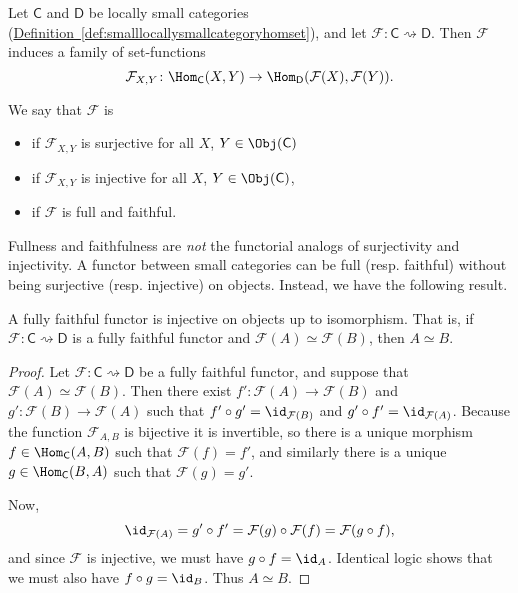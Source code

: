 \documentclass[notes.tex]{subfiles}
\begin{document}
\begin{definition}
  \label{def:fullfaithfulfunctor}
  Let $\mathsf{C}$ and $\mathsf{D}$ be locally small categories (\hyperref[def:smalllocallysmallcategoryhomset]{Definition~\ref*{def:smalllocallysmallcategoryhomset}}), and let $\mathcal{F}: \mathsf{C} \rightsquigarrow \mathsf{D}$. Then $\mathcal{F}$ induces a family of set-functions
  \begin{equation*}
    \mathcal{F}_{X, Y}\colon \Hom_{\mathsf{C}}(X, Y) \to \Hom_{\mathsf{D}}(\mathcal{F}(X), \mathcal{F}(Y)).
  \end{equation*}

  We say that $\mathcal{F}$ is
  \begin{itemize}
    \item {} if $\mathcal{F}_{X, Y}$ is surjective for all $X$, $Y \in \Obj(\mathsf{C})$
    \item {} if $\mathcal{F}_{X, Y}$ is injective for all $X$, $Y \in \Obj(\mathsf{C})$,
    \item {} if $\mathcal{F}$ is full and faithful.
  \end{itemize}
\end{definition}

\begin{note}
  Fullness and faithfulness are \emph{not} the functorial analogs of surjectivity and injectivity. A functor between small categories can be full (resp. faithful) without being surjective (resp. injective) on objects. Instead, we have the following result.
\end{note}

\begin{lemma}
  \label{lemma:fullyfaithfulfunctorinjectiveuptoisomorphism}
  A fully faithful functor is injective on objects up to isomorphism. That is, if  $\mathcal{F}\colon \mathsf{C} \rightsquigarrow \mathsf{D}$ is a fully faithful functor and $\mathcal{F}(A) \simeq \mathcal{F}(B)$, then $A \simeq B$.
\end{lemma}
\begin{proof}
  Let $\mathcal{F}\colon \mathsf{C} \rightsquigarrow \mathsf{D}$ be a fully faithful functor, and suppose that $\mathcal{F}(A) \simeq \mathcal{F}(B)$. Then there exist $f'\colon \mathcal{F}(A) \to \mathcal{F}(B)$ and $g'\colon \mathcal{F}(B) \to \mathcal{F}(A)$ such that $f' \circ g' = \id_{\mathcal{F}(B)}$ and $g' \circ f' = \id_{\mathcal{F}(A)}$. Because the function $\mathcal{F}_{A, B}$ is bijective it is invertible, so there is a unique morphism $f \in \Hom_{\mathsf{C}}(A, B)$ such that $\mathcal{F}(f) = f'$, and similarly there is a unique $g \in \Hom_{\mathsf{C}}(B, A)$ such that $\mathcal{F}(g) = g'$.

  Now,
  \begin{equation*}
    \id_{\mathcal{F}(A)} = g' \circ f' = \mathcal{F}(g) \circ \mathcal{F}(f) = \mathcal{F}(g \circ f),
  \end{equation*}
  and since $\mathcal{F}$ is injective, we must have $g \circ f = \id_{A}$. Identical logic shows that we must also have $f \circ g = \id_{B}$. Thus $A \simeq B$.
\end{proof}
\end{document}
